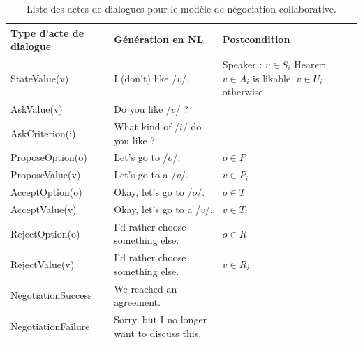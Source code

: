 			\begin{table}[t]
					\centering
					\begin{tabular} {|p{3.25cm}|p{4cm}|p{3.25cm}|}
						\hline
						\textbf{Type d'acte de dialogue}  &\textbf{ Génération en NL} & \textbf{Postcondition}\\
						\hline
						StateValue(v) &  I (don't) like /$v$/. & Speaker : $v \in S_i$ \newline Hearer:  \newline $v\in A_i$ is likable, $v\in U_i$ otherwise \\
						\hline
						AskValue(v)& Do you like /$v$/ ? & \multirow{2}{*}{} \\
						
						AskCriterion(i) &  What kind of /$i$/ do you like ? & \\
						\hline
						ProposeOption(o)  & Let's go to /$o$/. & $o \in P$\\
						
						ProposeValue(v) & Let's go to a /$v$/. & $v \in P_i$\\
						\hline
						AcceptOption(o)& Okay, let's go to /$o$/.& $o \in T$ \\
						
						AcceptValue(v) & Okay, let's go to a /$v$/.& $v \in T_i$ \\
						\hline
						RejectOption(o) & I'd rather choose  something else. & $o \in R$\\
						
						RejectValue(v) &  I'd rather choose  something else. & $v \in R_i$ \\
						\hline
						NegotiationSuccess &  We reached an agreement. & \multirow{2}{*}{}\\
						\cline{1-2}
						NegotiationFailure &  Sorry, but I no longer want to discuss this. & \\
						\hline
					\end{tabular}
				
				\caption{\label{table:utt}Liste des actes de dialogues pour le modèle de négociation collaborative.}
			\end{table}
		
